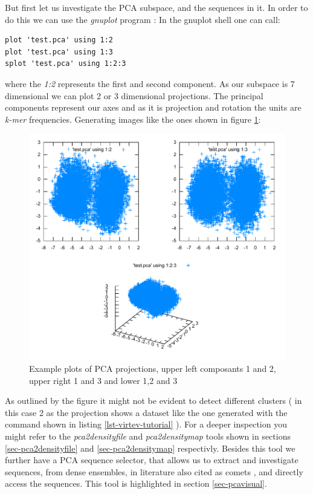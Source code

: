But first let us investigate the PCA subspace,
and the sequences in it. In order to do this we can use the
\emph{gnuplot} program \cite{gnuplot}:
In the gnuplot shell one can call:
\begin{lstlisting}
plot 'test.pca' using 1:2
plot 'test.pca' using 1:3
splot 'test.pca' using 1:2:3
\end{lstlisting}
where the \emph{1:2} represents the first and second component.
As our subspace is 7 dimensional we can plot 2 or 3 dimensional
projections. The principal components represent our axes and as
it is projection and rotation the units are \emph{k-mer}
frequencies. Generating images like the ones shown in figure
\ref{fig-pca-tutorial}:
\begin{figure}
  \begin{center}
    \includegraphics[scale=0.9]{pca-tutorial.pdf}
    \caption{Example plots of PCA projections, upper left composants 1
      and 2, upper right 1 and 3 and lower 1,2 and 3}
    \label{fig-pca-tutorial}
  \end{center}
\end{figure}
As outlined by the figure it might not be evident to detect
different clusters ( in this case 2 as the projection shows a dataset
like the one generated with the command shown in listing
\ref{lst-virtev-tutorial} ). For a deeper inspection you might refer
to the \emph{pca2densityfile} and \emph{pca2densitymap} tools shown in
sections \ref{sec-pca2densityfile} and \ref{sec-pca2densitymap}
respectivly. Besides this tool we further have a PCA sequence selector,
that allows us to extract and investigate sequences, from
dense ensembles, in literature also cited as comets \cite{lauriane},
and directly access the sequences. This tool is highlighted in section
\ref{sec-pcavisual}.

